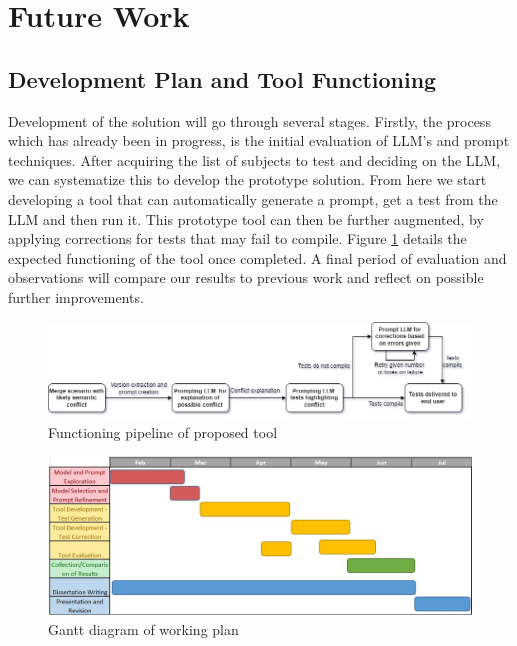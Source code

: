 \section{Future Work}

\subsection{Development Plan and Tool Functioning}

Development of the solution will go through several stages. Firstly, the process which has already been in progress, is the initial evaluation of LLM's and prompt techniques. After acquiring the list of subjects to test and deciding on the LLM, we can systematize this to develop the prototype solution. From here we start developing a tool that can automatically generate a prompt, get a test from the LLM and then run it. This prototype tool can then be further augmented, by applying corrections for tests that may fail to compile. Figure \ref{fig:tool} details the expected functioning of the tool once completed. A final period of evaluation and observations will compare our results to previous work and reflect on possible further improvements.

\begin{figure}
    \centering
    \includegraphics[width=1\linewidth]{figures/tool.png}
    \caption{Functioning pipeline of proposed tool}
    \label{fig:tool}
\end{figure}

\begin{figure}
    \centering
    \includegraphics[width=1\linewidth]{figures/gantt.jpg}
    \caption{Gantt diagram of working plan}
    \label{fig:gantt}
\end{figure}